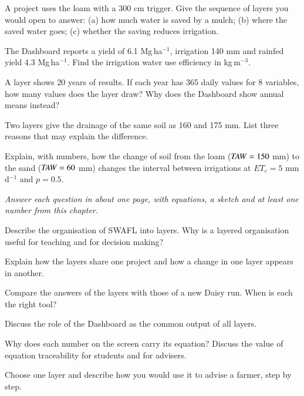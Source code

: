 \begin{exlist}
\item A project uses the loam with a 300 cm trigger. Give the sequence of layers you would open to answer: (a) how much water is saved by a mulch; (b) where the saved water goes; (c) whether the saving reduces irrigation.
\item The Dashboard reports a yield of 6.1 Mg\,ha$^{-1}$, irrigation 140 mm and rainfed yield 4.3 Mg\,ha$^{-1}$. Find the irrigation water use efficiency in kg\,m$^{-3}$.
\item A layer shows 20 years of results. If each year has 365 daily values for 8 variables, how many values does the layer draw? Why does the Dashboard show annual means instead?
\item Two layers give the drainage of the same soil as 160 and 175 mm. List three reasons that may explain the difference.
\item Explain, with numbers, how the change of soil from the loam ($\mathit{TAW}=150$ mm) to the sand ($\mathit{TAW}=60$ mm) changes the interval between irrigations at $ET_c=5$ mm\,d$^{-1}$ and $p=0.5$.
\end{exlist}
{\small\itshape Answer each question in about one page, with equations, a sketch and at least one number from this chapter.}\par\vspace{3pt}
\begin{exlist}
\item Describe the organisation of SWAFL into layers. Why is a layered organisation useful for teaching and for decision making?
\item Explain how the layers share one project and how a change in one layer appears in another.
\item Compare the answers of the layers with those of a new Daisy run. When is each the right tool?
\item Discuss the role of the Dashboard as the common output of all layers.
\item Why does each number on the screen carry its equation? Discuss the value of equation traceability for students and for advisers.
\item Choose one layer and describe how you would use it to advise a farmer, step by step.
\end{exlist}
